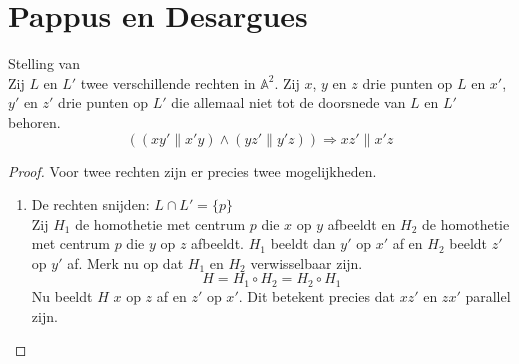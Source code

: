 \documentclass[main.tex]{subfiles}
\begin{document}
\section{Pappus en Desargues}
\label{sec:pappus-en-desargues}

\begin{st}
  Stelling van \\
  Zij $L$ en $L'$ twee verschillende rechten in $\mathbb{A}^{2}$.
  Zij $x$, $y$ en $z$ drie punten op $L$ en $x'$, $y'$ en $z'$ drie punten op $L'$ die allemaal niet tot de doorsnede van $L$ en $L'$ behoren.
  \[
  ((xy' \parallel x'y) \wedge (yz' \parallel y'z)) \Rightarrow xz' \parallel x'z
  \]
  
  \begin{proof}
    Voor twee rechten zijn er precies twee mogelijkheden.
    \begin{enumerate}
    \item De rechten snijden: $L \cap L' = \{ p \}$\\
      Zij $H_{1}$ de homothetie met centrum $p$ die $x$ op $y$ afbeeldt en $H_{2}$ de homothetie met centrum $p$ die $y$ op $z$ afbeeldt.
      $H_{1}$ beeldt dan $y'$ op $x'$ af en $H_{2}$ beeldt $z'$ op $y'$ af.
      Merk nu op dat $H_{1}$ en $H_{2}$ verwisselbaar zijn.
      \[ H = H_{1} \circ H_{2} = H_{2} \circ H_{1} \]
      Nu beeldt $H$ $x$ op $z$ af en $z'$ op $x'$.
      Dit betekent precies dat $xz'$ en $zx'$ parallel zijn.

      \begin{figure}[H]
        \centering
\end{figure}
\end{enumerate}
\end{proof}
\end{st}
\end{document}
